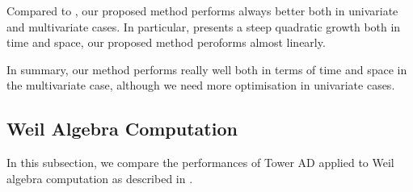 \documentclass[rims-smooth-paper.tex]{subfiles}
\begin{document}
Compared to , our proposed method performs always better both in univariate and multivariate cases.
In particular,  presents a steep quadratic growth both in time and space, our proposed method peroforms almost linearly.

In summary, our method performs really well both in terms of time and space in the multivariate case, although we need more optimisation in univariate cases.

\subsection{Weil Algebra Computation}
In this subsection, we compare the performances of Tower AD applied to Weil algebra computation as described in \cite{Ishii:2021vw}.

\end{document}
